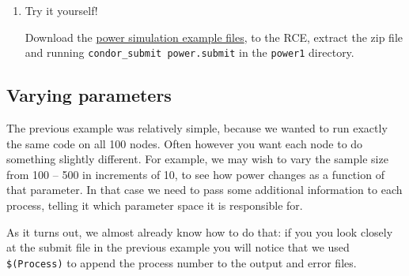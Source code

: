 \documentclass[
]{book}
\newenvironment{Shaded}{\begin{snugshade}}{\end{snugshade}}
\newcommand{\CharTok}[1]{\textcolor[rgb]{0.31,0.60,0.02}{#1}}
\newcommand{\CommentTok}[1]{\textcolor[rgb]{0.56,0.35,0.01}{\textit{#1}}}
\newcommand{\DataTypeTok}[1]{\textcolor[rgb]{0.13,0.29,0.53}{#1}}
\newcommand{\KeywordTok}[1]{\textcolor[rgb]{0.13,0.29,0.53}{\textbf{#1}}}
\newcommand{\NormalTok}[1]{#1}
\newcommand{\OtherTok}[1]{\textcolor[rgb]{0.56,0.35,0.01}{#1}}
\newcommand{\StringTok}[1]{\textcolor[rgb]{0.31,0.60,0.02}{#1}}
\begin{document}
\begin{enumerate}
\begin{Shaded}
\end{Shaded}
\item
  Try it yourself!

  Download the \href{examples_R/power1.zip}{power simulation example
  files}, to the RCE, extract the zip file and
  running \texttt{condor\_submit\ power.submit} in the \texttt{power1} directory.
\end{enumerate}

\hypertarget{varying-parameters}{%
\subsection{Varying parameters}\label{varying-parameters}}

The previous example was relatively simple, because we wanted to run
exactly the same code on all 100 nodes. Often however you want each node
to do something slightly different. For example, we may wish to vary the
sample size from 100 -- 500 in increments of 10, to see how power
changes as a function of that parameter. In that case we need to pass
some additional information to each process, telling it which parameter
space it is responsible for.

As it turns out, we almost already know how to do that: if you you look
closely at the submit file in the previous example you will notice that
we used \texttt{\$(Process)} to append the process number to the output and
error files.
\end{document}
